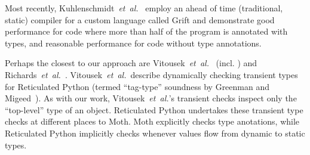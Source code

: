 
Most recently, Kuhlenschmidt~\textit{et~al.}~\cite{Kuhlenschmidt:2018:preprint} employ an
ahead of time (\ie traditional, static) compiler for a custom
language called Grift and demonstrate good performance for code where more than
half of the program is annotated with types, and reasonable
performance for code without type annotations.

\label{reticRW}
Perhaps the closest to our approach are
Vitousek~\textit{et~al.}~\cite{reticPython2014} (incl. \citep{Vitousek2017,Greenman2018})
and Richards~\textit{et~al.}~\cite{Richards2017}.
Vitousek~\textit{et~al.}~describe dynamically checking transient types
for Reticulated Python (termed ``tag-type'' soundness by Greenman
and Migeed~\cite{Greenman2018}).
As with our work, Vitousek~\textit{et~al.}'s transient checks inspect
only the ``top-level'' type of an
object.
%
%
Reticulated Python undertakes these transient type checks at different
places to Moth.  Moth explicitly checks type anotations, while
Reticulated Python implicitly checks whenever values flow from dynamic
to static types.
%
